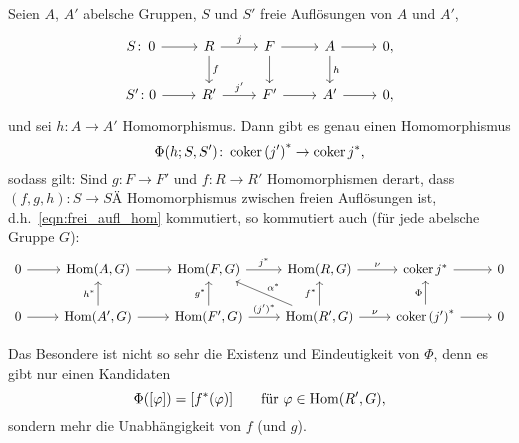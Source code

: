 \begin{prop}
  \label{thm:hom_freier_aufloesungen}
  Seien $A$, $A'$ abelsche Gruppen, $S$ und $S'$ freie Auflösungen von $A$ und $A'$,
  \begin{equation*}
    \begin{tikzcd}
      S\colon\,0 \arrow{r}{} & R   \arrow{d}{f}
                              \arrow{r}{j}  & F   \arrow{d}{}
                                                  \arrow{r}{}   & A   \arrow{d}{h}
                                                                      \arrow{r}{} & 0, \\
      S'\colon 0 \arrow{r}{} & R'  \arrow{r}{j'} & F'  \arrow{r}{}   & A'  \arrow{r}{} & 0,
    \end{tikzcd}
  \end{equation*}
  und sei $h\colon A \to A'$ Homomorphismus.
  Dann gibt es genau einen Homomorphismus
  \begin{equation*}
    \Phi(h;S,S') \colon \operatorname{coker} {(j')}^* \to \operatorname{coker} j^*,
  \end{equation*}
  sodass gilt: Sind $g \colon F \to F'$ und $f \colon R \to R'$ Homomorphismen derart, dass $(f,g,h) \colon S \to SÄ$ Homomorphismus zwischen freien Auflösungen ist, d.h.~\eqref{eqn:frei_aufl_hom} kommutiert, so kommutiert auch (für jede abelsche Gruppe $G$):
  \begin{equation*}
    \begin{tikzcd}
      0 \arrow{r}{}   & \Hom(A,G)   \arrow{r}{}   & \Hom(F,G) \arrow{r}{j^*}        & \Hom(R,G) \arrow{r}{\nu}  & \coker j^* \arrow{r}{}      & 0 \\
      0 \arrow{r}{}   & \Hom(A',G)  \arrow{u}{h^*}
                                    \arrow{r}{}   & \Hom(F',G)\arrow{u}{g^*}
                                                              \arrow{r}{{(j')}^*}  & \Hom(R',G) \arrow{u}{f^*}
                                                                                                \arrow[swap]{ul}{\alpha^*}
                                                                                                \arrow{r}{\nu} & \coker {(j')}^* \arrow{u}{\Phi}
                                                                                                                              \arrow{r}{} & 0
    \end{tikzcd}
  \end{equation*}
\end{prop}
\begin{kommentar}
  Das Besondere ist nicht so sehr die Existenz und Eindeutigkeit von $\Phi$, denn es gibt nur einen Kandidaten
  \begin{equation*}
    \Phi([\varphi]) = [f^*(\varphi)]  \qquad \text{für } \varphi \in \mathrm{Hom}(R',G), 
  \end{equation*}
  sondern mehr die Unabhängigkeit von $f$ (und $g$).
\end{kommentar}
